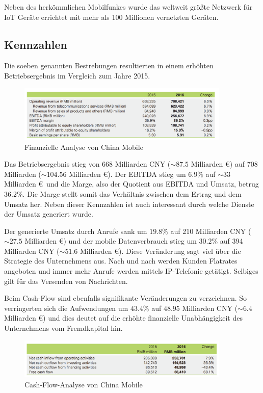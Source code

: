 Neben des herkömmlichen Mobilfunkes wurde das weltweit größte Netzwerk für IoT Geräte errichtet mit mehr als 100 Millionen vernetzten Geräten. 

\subsection{Kennzahlen}

Die soeben genannten Bestrebungen resultierten in einem erhöhten Betriebsergebnis im Vergleich zum Jahre 2015.

\begin{figure}[H]
\centering
\includegraphics[width=0.9\textwidth]{pictures/finances}
\caption{Finanzielle Analyse von China Mobile \cite{chinareport}}
\label{fig:lteplus}
\end{figure}

Das Betriebsergebnis stieg von 668 Milliarden CNY ($\sim 87.5$ Milliarden \euro) auf 708 Milliarden ($\sim 104.56$ Milliarden \euro). Der EBITDA stieg um $6.9\%$ auf $\sim 33$ Milliarden \euro \ und die Marge, also der Quotient aus EBITDA und Umsatz, betrug $36.2\%$. Die Marge stellt somit das Verhältnis zwischen dem Ertrag und dem Umsatz her. Neben dieser Kennzahlen ist auch interessant durch welche Dienste der Umsatz generiert wurde. 

Der generierte Umsatz durch Anrufe sank um $19.8\%$ auf 210 Milliarden CNY ($\sim 27.5$ Milliarden \euro) und der mobile Datenverbrauch stieg um $30.2\%$ auf 394 Milliarden CNY ($\sim 51.6$ Milliarden \euro). Diese Veränderung sagt viel über die Strategie des Unternehmens aus. Nach und nach werden Kunden Flatrates angeboten und immer mehr Anrufe werden mittels IP-Telefonie getätigt. Selbiges gilt für das Versenden von Nachrichten.  

Beim Cash-Flow sind ebenfalls signifikante Veränderungen zu verzeichnen. So verringerten sich die Aufwendungen um $43.4\%$ auf $48.95$ Milliarden CNY ($\sim 6.4$ Milliarden \euro) und dies deutet auf die erhöhte finanzielle Unabhängigkeit des Unternehmens vom Fremdkapital hin.

\begin{figure}[H]
\centering
\includegraphics[width=0.9\textwidth]{pictures/cashflow}
\caption{Cash-Flow-Analyse von China Mobile \cite{chinareport}}
\label{fig:lteplus}
\end{figure}

